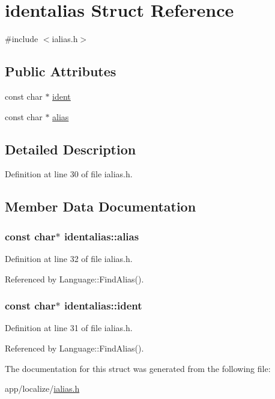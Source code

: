 \hypertarget{structidentalias}{}\section{identalias Struct Reference}
\label{structidentalias}


{\ttfamily \#include $<$ialias.\+h$>$}

\subsection*{Public Attributes}
\begin{DoxyCompactItemize}
\item 
const char $\ast$ \hyperlink{structidentalias_af949b7f21d7ee56e5d97fb316304922b}{ident}
\item 
const char $\ast$ \hyperlink{structidentalias_afc7150c842ea263f6015957769a97b4b}{alias}
\end{DoxyCompactItemize}


\subsection{Detailed Description}


Definition at line 30 of file ialias.\+h.



\subsection{Member Data Documentation}
\subsubsection[{\texorpdfstring{alias}{alias}}]{\setlength{\rightskip}{0pt plus 5cm}const char$\ast$ identalias\+::alias}\hypertarget{structidentalias_afc7150c842ea263f6015957769a97b4b}{}\label{structidentalias_afc7150c842ea263f6015957769a97b4b}


Definition at line 32 of file ialias.\+h.



Referenced by Language\+::\+Find\+Alias().

\subsubsection[{\texorpdfstring{ident}{ident}}]{\setlength{\rightskip}{0pt plus 5cm}const char$\ast$ identalias\+::ident}\hypertarget{structidentalias_af949b7f21d7ee56e5d97fb316304922b}{}\label{structidentalias_af949b7f21d7ee56e5d97fb316304922b}


Definition at line 31 of file ialias.\+h.



Referenced by Language\+::\+Find\+Alias().



The documentation for this struct was generated from the following file\+:\begin{DoxyCompactItemize}
\item 
app/localize/\hyperlink{ialias_8h}{ialias.\+h}\end{DoxyCompactItemize}
